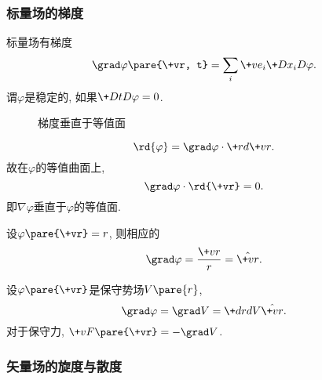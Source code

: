 \documentclass[../LectureNotes.tex]{subfiles}
\begin{document}
\subsubsection{标量场的梯度} %
\label{ssub:标量场的梯度}

标量场有梯度
\[ \grad\varphi\pare{\+vr, t} = \sum_i \+ve_i \+D{x_i}D{\varphi}. \]
谓$\varphi$是稳定的, 如果$\displaystyle \+D{t}D{\varphi} = 0$.
\begin{figure}[ht]
    \centering
    \caption{梯度垂直于等值面}
\end{figure}
\[ \rd{\varphi} = \grad\varphi \cdot\+rd{\+vr}. \]
故在$\varphi$的等值曲面上,
\[ \grad\varphi \cdot \rd{\+vr} = 0. \]
即$\nabla\varphi$垂直于$\varphi$的等值面.
\begin{sample}
    \begin{ex}
        设$\varphi\pare{\+vr} = r$, 则相应的
        \[ \grad\varphi = \frac{\+vr}{r} = \hat{\+vr}. \]
    \end{ex}
    \begin{ex}
        设$\varphi\pare{\+vr}$是保守势场$V\pare{r}$,
        \[ \grad\varphi = \grad V  = \+drdV \hat{\+vr}. \]
        对于保守力, $\+vF\pare{\+vr} = -\grad V$.
    \end{ex}
\end{sample}


\subsubsection{矢量场的旋度与散度} %
\label{ssub:矢量场的旋度与散度}
\end{document}
